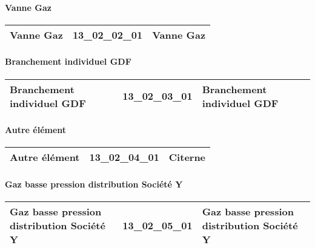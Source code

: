 \documentclass[12pt,titlepage]{book}
\begin{document}
\paragraph{Vanne Gaz}
\noindent
\vspace{\baselineskip}

\renewcommand{\arraystretch}{1.2}
\begin{supertabular}{|p{10cm}|c|p{15cm}|}
 Vanne Gaz & 13\_02\_02\_01 & Vanne Gaz\\
\hline
\end{supertabular}


\paragraph{Branchement individuel GDF}
\noindent
\vspace{\baselineskip}

\renewcommand{\arraystretch}{1.2}
\begin{supertabular}{|p{10cm}|c|p{15cm}|}
 Branchement individuel GDF & 13\_02\_03\_01 & Branchement individuel GDF\\
\hline
\end{supertabular}


\paragraph{Autre élément}
\noindent
\vspace{\baselineskip}

\renewcommand{\arraystretch}{1.2}
\begin{supertabular}{|p{10cm}|c|p{15cm}|}
 Autre élément & 13\_02\_04\_01 & Citerne\\
\hline
\end{supertabular}


\paragraph{Gaz basse pression distribution Société Y}
\noindent
\vspace{\baselineskip}

\renewcommand{\arraystretch}{1.2}
\begin{supertabular}{|p{10cm}|c|p{15cm}|}
 Gaz basse pression distribution Société Y & 13\_02\_05\_01 & Gaz basse pression distribution Société Y\\
\hline
\end{supertabular}
\end{document}
